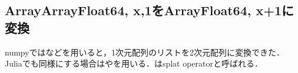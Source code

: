 \subsection{Array{Array{Float64, x},1}をArray{Float64, x+1}に変換}numpyではなどを用いると，1次元配列のリストを2次元配列に変換できた．Juliaでも同様にする場合はやを用いる．はsplat operatorと呼ばれる．